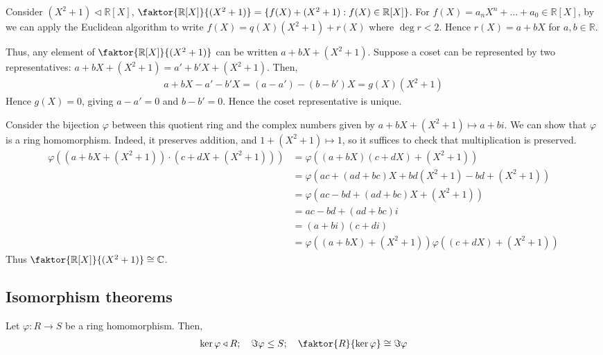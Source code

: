 \begin{example}
	Consider $(X^2 + 1) \triangleleft \mathbb R[X]$, $\faktor{\mathbb{R}[X]}{(X^2 + 1)} = \{f(X) + (X^2 + 1) : f(X) \in \mathbb{R}[X]\}$.
	For $f(X) = a_n X^n + \dots + a_0 \in \mathbb R[X]$, by  we can apply the Euclidean algorithm to write $f(X) = q(X) (X^2 + 1) + r(X)$ where $\deg r < 2$.
	Hence $r(X) = a+bX$ for $a, b \in \mathbb{R}$. 

	Thus, any element of $\faktor{\mathbb R[X]}{(X^2 + 1)}$ can be written $a+bX + (X^2 + 1)$.
	Suppose a coset can be represented by two representatives: $a+bX + (X^2+1) = a' + b'X + (X^2 + 1)$.
	Then,
	\begin{align*}
		a+bX - a' - b'X = (a-a') - (b-b')X = g(X) (X^2 + 1)
	\end{align*}
	Hence $g(X) = 0$, giving $a-a' = 0$ and $b-b' = 0$.
	Hence the coset representative is unique.

	Consider the bijection $\varphi$ between this quotient ring and the complex numbers given by $a+bX + (X^2 + 1) \mapsto a+bi$.
	We can show that $\varphi$ is a ring homomorphism.
	Indeed, it preserves addition, and $1 + (X^2 + 1) \mapsto 1$, so it suffices to check that multiplication is preserved.
	\begin{align*}
		\varphi((a+bX + (X^2 + 1)) \cdot (c+dX + (X^2 + 1))) & = \varphi((a+bX)(c+dX) + (X^2 + 1)) \\
		& = \varphi(ac + (ad + bc)X + bd (X^2 + 1) - bd + (X^2 + 1)) \\
		& = \varphi(ac-bd+(ad+bc)X + (X^2 + 1))                      \\
		& = ac - bd + (ad + bc)i                                     \\
		& = (a+bi)(c+di)                                             \\
		& = \varphi((a+bX) + (X^2 + 1)) \varphi((c+dX) + (X^2 + 1))
	\end{align*}
	Thus $\faktor{\mathbb R[X]}{(X^2 + 1)} \cong \mathbb C$.
\end{example}

\subsection{Isomorphism theorems}
\begin{theorem}
	Let $\varphi \colon R \to S$ be a ring homomorphism.
	Then,
	\begin{align*}
		\ker \varphi \triangleleft R;\quad \Im \varphi \leq S;\quad \faktor{R}{\ker \varphi} \cong \Im \varphi
	\end{align*}
\end{theorem}

